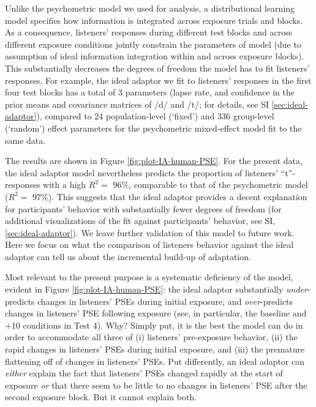 \documentclass[
  11pt,
  man,mask,floatsintext]{apa6}
\begin{document}
Unlike the psychometric model we used for analysis, a distributional learning model specifies how information is integrated across exposure trials and blocks. As a consequence, listeners' responses during different test blocks and across different exposure conditions jointly constrain the parameters of model (due to assumption of ideal information integration within and across exposure blocks). This substantially decreases the degrees of freedom the model has to fit listeners' responses. For example, the ideal adaptor we fit to listeners' responses in the first four test blocks has a total of 3 parameters (lapse rate, and confidence in the prior means and covariance matrices of /d/ and /t/; for details, see SI \ref{sec:ideal-adaptor}), compared to 24 population-level (`fixed') and 336 group-level (`random') effect parameters for the psychometric mixed-effect model fit to the same data.

The results are shown in Figure \ref{fig:plot-IA-human-PSE}. For the present data, the ideal adaptor model nevertheless predicts the proportion of listeners' ``t''-responses with a high \(R^2 =\) 96\(\%\), comparable to that of the psychometric model (\(R^2 =\) 97\(\%\)). This suggests that the ideal adaptor provides a decent explanation for participants' behavior with substantially fewer degrees of freedom (for additional visualizations of the fit against participants' behavior, see SI, \ref{sec:ideal-adaptor}). We leave further validation of this model to future work. Here we focus on what the comparison of listeners behavior against the ideal adaptor can tell us about the incremental build-up of adaptation.

Most relevant to the present purpose is a systematic deficiency of the model, evident in Figure \ref{fig:plot-IA-human-PSE}: the ideal adaptor substantially \emph{under}-predicts changes in listeners' PSEs during initial exposure, and \emph{over}-predicts changes in listeners' PSE following exposure (see, in particular, the baseline and +10 conditions in Test 4). Why? Simply put, it is the best the model can do in order to accommodate all three of (i) listeners' pre-exposure behavior, (ii) the rapid changes in listeners' PSEs during initial exposure, and (iii) the premature flattening off of changes in listeners' PSEs. Put differently, an ideal adaptor can \emph{either} explain the fact that listeners' PSEs changed rapidly at the start of exposure \emph{or} that there seem to be little to no changes in listeners' PSE after the second exposure block. But it cannot explain both.
\end{document}
